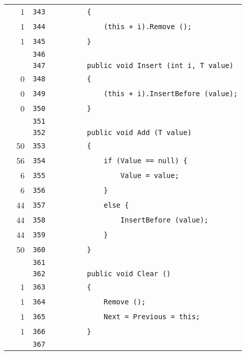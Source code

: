 \documentclass[a4paper,10pt]{article}
\begin{document}
\begin{longtable}[l]{lrrl}
\cellcolor{green} & 1 & \verb~343~ & \verb~        {~\\
\cellcolor{green} & 1 & \verb~344~ & \verb~            (this + i).Remove ();~\\
\cellcolor{green} & 1 & \verb~345~ & \verb~        }~\\
\cellcolor{gray} &  & \verb~346~ & \verb~~\\
\cellcolor{gray} &  & \verb~347~ & \verb~        public void Insert (int i, T value)~\\
\cellcolor{red} & 0 & \verb~348~ & \verb~        {~\\
\cellcolor{red} & 0 & \verb~349~ & \verb~            (this + i).InsertBefore (value);~\\
\cellcolor{red} & 0 & \verb~350~ & \verb~        }~\\
\cellcolor{gray} &  & \verb~351~ & \verb~~\\
\cellcolor{gray} &  & \verb~352~ & \verb~        public void Add (T value)~\\
\cellcolor{green} & 50 & \verb~353~ & \verb~        {~\\
\cellcolor{green} & 56 & \verb~354~ & \verb~            if (Value == null) {~\\
\cellcolor{green} & 6 & \verb~355~ & \verb~                Value = value;~\\
\cellcolor{green} & 6 & \verb~356~ & \verb~            }~\\
\cellcolor{green} & 44 & \verb~357~ & \verb~            else {~\\
\cellcolor{green} & 44 & \verb~358~ & \verb~                InsertBefore (value);~\\
\cellcolor{green} & 44 & \verb~359~ & \verb~            }~\\
\cellcolor{green} & 50 & \verb~360~ & \verb~        }~\\
\cellcolor{gray} &  & \verb~361~ & \verb~~\\
\cellcolor{gray} &  & \verb~362~ & \verb~        public void Clear ()~\\
\cellcolor{green} & 1 & \verb~363~ & \verb~        {~\\
\cellcolor{green} & 1 & \verb~364~ & \verb~            Remove ();~\\
\cellcolor{green} & 1 & \verb~365~ & \verb~            Next = Previous = this;~\\
\cellcolor{green} & 1 & \verb~366~ & \verb~        }~\\
\cellcolor{gray} &  & \verb~367~ & \verb~~\\

\end{longtable}
\end{document}
